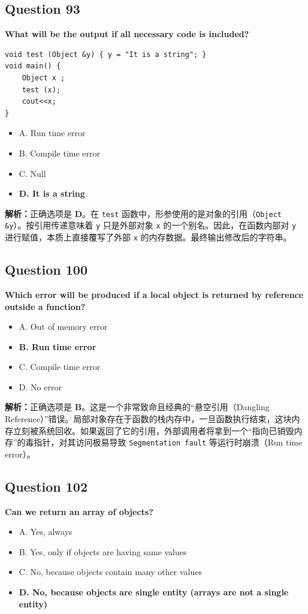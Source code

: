 \documentclass[11pt, a4paper]{article}
\begin{document}

\subsection*{Question 93}
\textbf{What will be the output if all necessary code is included?}
\begin{lstlisting}
void test (Object &y) { y = "It is a string"; }
void main() {
    Object x ;
    test (x);
    cout<<x;
}
\end{lstlisting}
\begin{itemize}
    \item A. Run time error
    \item B. Compile time error
    \item C. Null
    \item \textbf{D. It is a string}
\end{itemize}

\textbf{解析：}正确选项是 \textbf{D}。在 \texttt{test} 函数中，形参使用的是对象的引用（\texttt{Object \&y}）。按引用传递意味着 \texttt{y} 只是外部对象 \texttt{x} 的一个别名。因此，在函数内部对 \texttt{y} 进行赋值，本质上直接覆写了外部 \texttt{x} 的内存数据。最终输出修改后的字符串。


\subsection*{Question 100}
\textbf{Which error will be produced if a local object is returned by reference outside a function?}
\begin{itemize}
    \item A. Out of memory error
    \item \textbf{B. Run time error}
    \item C. Compile time error
    \item D. No error
\end{itemize}

\textbf{解析：}正确选项是 \textbf{B}。这是一个非常致命且经典的“悬空引用（Dangling Reference）”错误。局部对象存在于函数的栈内存中，一旦函数执行结束，这块内存立刻被系统回收。如果返回了它的引用，外部调用者将拿到一个“指向已销毁内存”的毒指针，对其访问极易导致 \texttt{Segmentation fault} 等运行时崩溃（Run time error）。


\subsection*{Question 102}
\textbf{Can we return an array of objects?}
\begin{itemize}
    \item A. Yes, always
    \item B. Yes, only if objects are having same values
    \item C. No, because objects contain many other values
    \item \textbf{D. No, because objects are single entity (arrays are not a single entity)}
\end{itemize}
\end{document}
